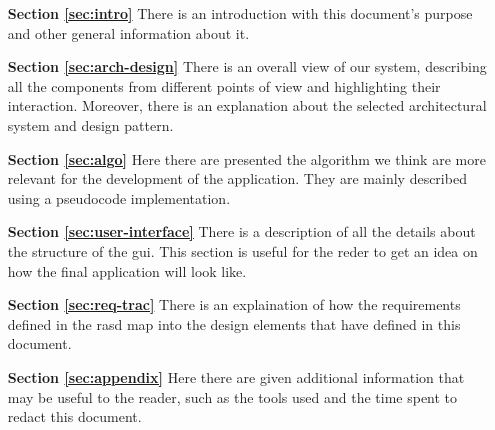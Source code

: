 \begin{itemize}

\item[\textbf{Section \ref{sec:intro}}]There is an introduction with this document's purpose and other general information about it.

\item[\textbf{Section \ref{sec:arch-design}}]There is an overall view of our system, describing all the components from different points of view and  highlighting their interaction. Moreover, there is an explanation about the selected architectural system and design pattern.

\item[\textbf{Section \ref{sec:algo}}]Here there are presented the algorithm we think are more relevant for the development of the application. They are mainly described using a pseudocode implementation.

\item[\textbf{Section \ref{sec:user-interface}}]There is a description of all the details about the structure of the \acl{gui}. This section is useful for the reder  to get an idea on how the final application will look like.

\item[\textbf{Section \ref{sec:req-trac}}]There is an explaination of how the requirements defined in the \acs{rasd} map into the design elements that have defined in this document.

\item[\textbf{Section \ref{sec:appendix}}]Here there are given additional information that may be useful to the reader, such as the tools used and the time spent to redact this document.
\end{itemize}

